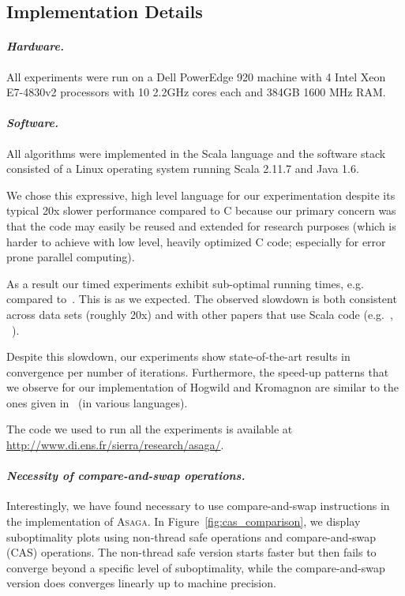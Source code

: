 \documentclass[twoside, 11pt]{article}
\newcommand{\ASAGA}{\textsc{Asaga}}
\begin{document}
\subsection{Implementation Details}
\paragraph{\textit{Hardware.}}
All experiments were run on a Dell PowerEdge 920 machine with 4 Intel Xeon E7-4830v2 processors with 10 2.2GHz cores each and 384GB 1600 MHz RAM.

\paragraph{\textit{Software.}} \label{scalavsc}
All algorithms were implemented in the Scala language and the software stack consisted of a Linux operating system running Scala 2.11.7 and Java 1.6.

We chose this expressive, high level language for our experimentation despite its typical 20x slower performance compared to C because our primary concern was that the code may easily be reused and extended for research purposes (which is harder to achieve with low level, heavily optimized C code; especially for error prone parallel computing).

As a result our timed experiments exhibit sub-optimal running times, e.g. compared to~\citet{s2gd}.
This is as we expected.
The observed slowdown is both consistent across data sets (roughly 20x) and with other papers that use Scala code (e.g.~\citealt{mania}, ~\citealt[Fig. 2]{cocoa}).

Despite this slowdown, our experiments show state-of-the-art results in convergence per number of iterations.
Furthermore, the speed-up patterns that we observe for our implementation of Hogwild and Kromagnon are similar to the ones given in~\citet{mania,hogwild,smola} (in various languages).

The code we used to run all the experiments is available at \url{http://www.di.ens.fr/sierra/research/asaga/}.

\paragraph{\textit{Necessity of compare-and-swap operations.}}
Interestingly, we have found necessary to use compare-and-swap instructions in the implementation of \ASAGA.
In Figure~\ref{fig:cas_comparison}, we display suboptimality plots using non-thread safe operations and compare-and-swap (CAS) operations. The non-thread safe version starts faster but then fails to converge beyond a specific level of suboptimality, while the compare-and-swap version does converges linearly up to machine precision.
\end{document}
